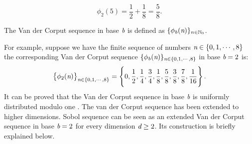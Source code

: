 \begin{equation}
\phi_2 (5) = \frac{1}{2}+\frac{1}{8} = \frac{5}{8}.
\end{equation}
\begin{definition}
The Van der Corput sequence in base $\textit{b}$ is defined as $\{ \phi_{\textit{b}}(\textit{n})\}_{n\in\mathbb{N}_0}$.
\end{definition}
For example, suppose we have the finite sequence of numbers $\textit{n}\in \{0, 1,\cdots, 8\}$  the corresponding Van der Corput sequence 
$\{ \phi_{\textit{b}}(\textit{n})\}_{\textit{n}\in \{0, 1,\cdots, 8\}}$ in base $\textit{b}=2$ is:
\begin{equation}
\big\{\phi_2(\textit{n})\big\}_{\textit{n}\in \{0, 1,\cdots, 8\}} = \Bigg\{0, \frac{1}{2}, \frac{1}{4}, \frac{3}{4}, \frac{1}{8},\frac{5}{8}, \frac{3}{8}, \frac{7}{8}, \frac{1}{16}\Bigg\} \,.
\end{equation}
It can be proved that the Van der Corput sequence in base $\textit{b}$ is uniformly distributed modulo one \cite{leobacher2014introduction}. 
The van der Corput sequence has been extended to higher dimensions. 
Sobol sequence can be seen as an extended Van der Corput sequence in base $\textit{b}=2$ for every dimension $\textit{d}\geq2$. Its construction is briefly explained below.

